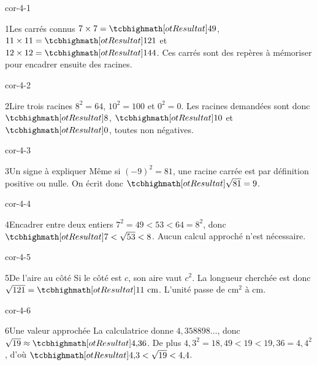 \clearpage\pagestyle{otMain}\setlength{\otBlocEspacement}{2.5mm}\fontsize{11}{15}\selectfont{}
\begin{blocLivre}{cor-4-1}\begin{corrige}{1}{Les carrés connus}
$7\times7=\res{49}$, $11\times11=\res{121}$ et $12\times12=\res{144}$. Ces carrés sont des repères à mémoriser pour encadrer ensuite des racines.
\end{corrige}\end{blocLivre}
\begin{blocLivre}{cor-4-2}\begin{corrige}{2}{Lire trois racines}
$8^2=64$, $10^2=100$ et $0^2=0$. Les racines demandées sont donc $\res8$, $\res{10}$ et $\res0$, toutes non négatives.
\end{corrige}\end{blocLivre}
\begin{blocLivre}{cor-4-3}\begin{corrige}{3}{Un signe à expliquer}
Même si $(-9)^2=81$, une racine carrée est par définition positive ou nulle. On écrit donc $\res{\sqrt{81}=9}$.
\end{corrige}\end{blocLivre}
\begin{blocLivre}{cor-4-4}\begin{corrige}{4}{Encadrer entre deux entiers}
$7^2=49<53<64=8^2$, donc $\res{7<\sqrt{53}<8}$. Aucun calcul approché n’est nécessaire.
\end{corrige}\end{blocLivre}
\begin{blocLivre}{cor-4-5}\begin{corrige}{5}{De l’aire au côté}
Si le côté est $c$, son aire vaut $c^2$. La longueur cherchée est donc $\sqrt{121}=\res{11\ \mathrm{cm}}$. L’unité passe de cm$^2$ à cm.
\label{fig-cor-4-5}
\end{corrige}\end{blocLivre}
\begin{blocLivre}{cor-4-6}\begin{corrige}{6}{Une valeur approchée}
La calculatrice donne $4{,}358898\ldots$, donc $\sqrt{19}\approx\res{4{,}36}$. De plus $4{,}3^2=18{,}49<19<19{,}36=4{,}4^2$, d’où $\res{4{,}3<\sqrt{19}<4{,}4}$.
\end{corrige}\end{blocLivre}
